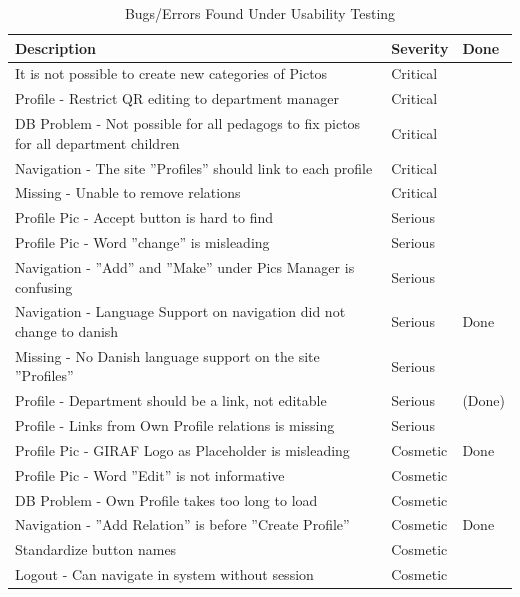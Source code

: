 \begin{table}[htbp]
	\centering
		\begin{tabular}{|l|l|l|}
			\hline
			Description & Severity & Done\\\hline\hline
			It is not possible to create new categories of Pictos & Critical &\\\hline
			Profile - Restrict QR editing to department manager & Critical &  \\\hline 
			DB Problem - Not possible for all pedagogs to fix pictos for all department children & Critical & \\\hline
			Navigation - The site ''Profiles'' should link to each profile & Critical &\\\hline
			Missing - Unable to remove relations & Critical & \\\hline
			Profile Pic - Accept button is hard to find & Serious &\\\hline
			Profile Pic - Word ''change'' is misleading & Serious &\\\hline
			Navigation - ''Add'' and ''Make'' under Pics Manager is confusing & Serious & \\\hline
			Navigation - Language Support on navigation did not change to danish & Serious & Done\\\hline
			Missing - No Danish language support on the site ''Profiles''& Serious &\\\hline
			Profile - Department should be a link, not editable & Serious & (Done)\\\hline
			Profile - Links from Own Profile relations is missing & Serious & \\\hline
			Profile Pic - GIRAF Logo as Placeholder is misleading  & Cosmetic & Done\\\hline
			Profile Pic - Word ''Edit'' is not informative & Cosmetic &\\\hline
			DB Problem - Own Profile takes too long to load & Cosmetic &  \\\hline
			Navigation - ''Add Relation''  is before ''Create Profile'' & Cosmetic & Done \\\hline
			Standardize button names & Cosmetic & \\\hline
			Logout - Can navigate in system without session & Cosmetic & \\\hline
	\end{tabular}
	\caption{Bugs/Errors Found Under Usability Testing}
	\label{tab:Bugs/Errors}
\end{table}

